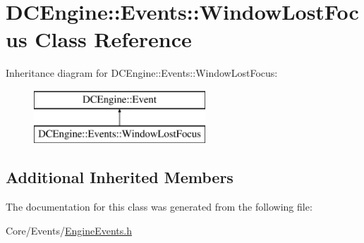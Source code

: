 \hypertarget{classDCEngine_1_1Events_1_1WindowLostFocus}{\section{D\-C\-Engine\-:\-:Events\-:\-:Window\-Lost\-Focus Class Reference}
\label{classDCEngine_1_1Events_1_1WindowLostFocus}
}
Inheritance diagram for D\-C\-Engine\-:\-:Events\-:\-:Window\-Lost\-Focus\-:\begin{figure}[H]
\begin{center}
\leavevmode
\includegraphics[height=2.000000cm]{classDCEngine_1_1Events_1_1WindowLostFocus}
\end{center}
\end{figure}
\subsection*{Additional Inherited Members}


The documentation for this class was generated from the following file\-:\begin{DoxyCompactItemize}
\item 
Core/\-Events/\hyperlink{EngineEvents_8h}{Engine\-Events.\-h}\end{DoxyCompactItemize}
